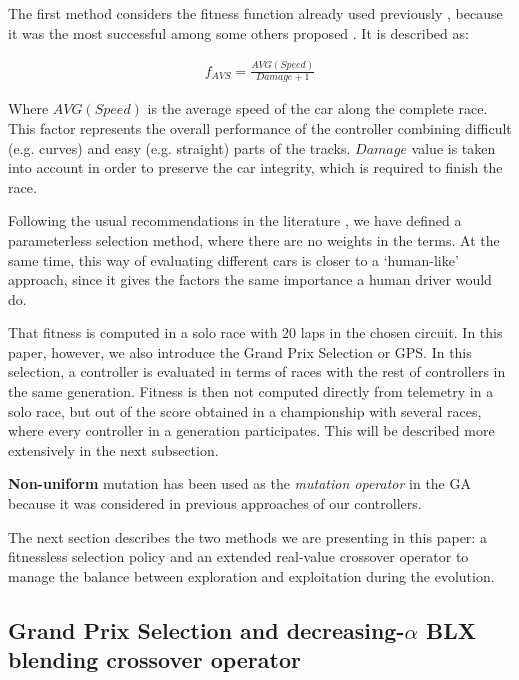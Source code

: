 \documentclass[10pt,journal,compsoc]{IEEEtran}
\begin{document}
The first method considers the fitness function already used
previously \cite{salem_cig2018}, because it was the most successful 
among some others proposed \cite{salem_evo18}. It is described as: 

 \begin{equation} \label{fit_avg}
 	\begin{array}{lll}
 		f_{AVS}= \frac{AVG(Speed)}{Damage+1}
 	\end{array}
 \end{equation}	

Where $AVG(Speed)$ is the average speed of the car along the complete
race. This factor represents the overall performance of the controller
combining difficult (e.g. curves) and easy (e.g. straight) parts of
the tracks. $Damage$ value is taken into account in order to preserve
the car integrity, which is required to finish the race. 

Following the usual recommendations in the literature
\cite{Harik-ParameterLess99}, we have defined a parameterless
selection method, where there are no weights in the terms.  At the
same time, this way of evaluating different cars is closer to a
`human-like' approach, since it gives the factors the same importance
a human driver would do.

That fitness is computed in a solo race with 20 laps in the chosen circuit. In this paper, however, we also introduce the Grand Prix Selection or GPS. In this
selection, a controller is evaluated in terms of races with the rest
of controllers in the same generation. Fitness is then not
computed directly from telemetry in a solo race, but out of the score
obtained in a championship with several races, where every controller
in a generation participates. This will be described more extensively
in the next subsection.

\textbf{Non-uniform} mutation \cite{mutation1997} has been used as the
\textit{mutation operator} in the GA because it was considered in
previous approaches of our controllers. 

The next section describes the two methods we are presenting in
this paper: a fitnessless selection policy and an extended real-value
crossover operator to manage the balance between exploration and
exploitation during the evolution. 

\subsection{Grand Prix Selection and decreasing-$\alpha$ BLX blending crossover operator}
\label{subsec:novel_operators}
\end{document}
